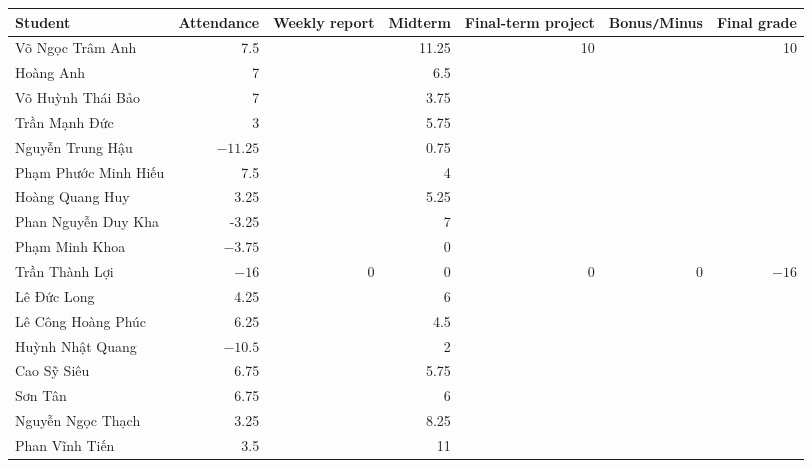 \documentclass{article}
\begin{document}
\begin{table}[H]
    \centering
    \begin{tabular}{|l|r|r|r|r|r|r|}
        \hline
        Student & Attendance & Weekly report & Midterm & Final-term project & Bonus{\tt/}Minus & Final grade \\
        \hline
        {\sc Võ Ngọc Trâm Anh} & 7.5 &  & 11.25 & 10 &  &  10 \\
        \hline
        {\sc Hoàng Anh} & 7 &  & 6.5 &  &  &  \\
        \hline
        {\sc Võ Huỳnh Thái Bảo} & 7 &  & 3.75 &  &  &  \\
        \hline
        {\sc Trần Mạnh Đức} & 3 &  & 5.75 &  &  &  \\
        \hline
        {\sc Nguyễn Trung Hậu} & $-11.25$ &  & 0.75 &  &  &  \\
        \hline
        {\sc Phạm Phước Minh Hiếu} & 7.5 &  & 4 &  &  &  \\
        \hline
        {\sc Hoàng Quang Huy} & 3.25 &  & 5.25 &  &  &  \\
        \hline
        {\sc Phan Nguyễn Duy Kha} & -3.25 &  & 7 &  &  &  \\
        \hline
        {\sc Phạm Minh Khoa} & $-3.75$ &  & 0 &  &  &  \\
        \hline
        {\sc Trần Thành Lợi} & $-16$ & 0 & 0 & 0 & 0 & $-16$ \\
        \hline
        {\sc Lê Đức Long} & 4.25 &  & 6 &  &  &  \\
        \hline
        {\sc Lê Công Hoàng Phúc} & 6.25 & & 4.5 &  &  &  \\
        \hline
        {\sc Huỳnh Nhật Quang} & $-10.5$ &  & 2 &  &  &  \\
        \hline
        {\sc Cao Sỹ Siêu} & 6.75 &  & 5.75 &  &  &  \\
        \hline
        {\sc Sơn Tân} & 6.75 &  & 6 &  &  &  \\
        \hline
        {\sc Nguyễn Ngọc Thạch} & 3.25 &  & 8.25 &  &  &  \\
        \hline
        {\sc Phan Vĩnh Tiến} & 3.5 &  & 11 &  &  &  \\
        \hline
    \end{tabular}
\end{table}

\end{document}
